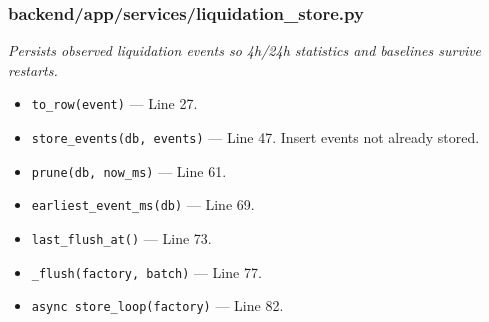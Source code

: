 \subsubsection*{backend/app/services/liquidation\_store.py}
\textit{Persists observed liquidation events so 4h/24h statistics and baselines survive restarts.}
\begin{itemize}[nosep,leftmargin=1.5em]
\item \texttt{to\_\allowbreak{}row(\allowbreak{}event)} --- Line 27.
\item \texttt{store\_\allowbreak{}events(\allowbreak{}db,\allowbreak{} events)} --- Line 47. Insert events not already stored.
\item \texttt{prune(\allowbreak{}db,\allowbreak{} now\_\allowbreak{}ms)} --- Line 61.
\item \texttt{earliest\_\allowbreak{}event\_\allowbreak{}ms(\allowbreak{}db)} --- Line 69.
\item \texttt{last\_\allowbreak{}flush\_\allowbreak{}at(\allowbreak{})} --- Line 73.
\item \texttt{\_\allowbreak{}flush(\allowbreak{}factory,\allowbreak{} batch)} --- Line 77.
\item \texttt{async store\_\allowbreak{}loop(\allowbreak{}factory)} --- Line 82.
\end{itemize}
